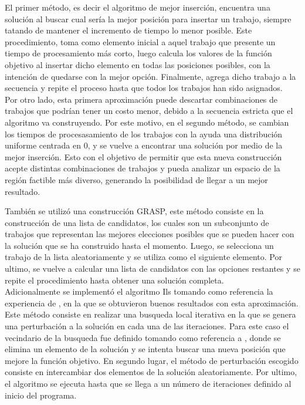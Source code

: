 \documentclass[10pt, twoside]{article}
\begin{document}
El primer método, es decir el algoritmo de mejor inserción, encuentra
una solución al buscar cual sería la mejor posición para insertar un trabajo,
siempre tatando de mantener el incremento de tiempo lo menor posible. Este
procedimiento, toma como elemento inicial a aquel trabajo que presente un tiempo de
procesamiento más corto, luego calcula los valores de la función objetivo
al insertar dicho elemento en todas las posiciones posibles, con la intención
de quedarse con la mejor opción. Finalmente, agrega dicho trabajo a la
secuencia y repite el proceso hasta que todos los trabajos han sido
asignados.\\

Por otro lado, esta primera aproximación puede descartar combinaciones de
trabajos que podrían tener un costo menor, debido a la secuencia estricta que el
algoritmo va construyendo. Por este motivo, en el segundo método, se cambian los
tiempos de procesasamiento de los trabajos con la ayuda una distribución
uniforme centrada en 0, y se vuelve a encontrar una solución por medio de la
mejor inserción. Esto con el objetivo de permitir que esta nueva construcción
acepte distintas combinaciones de trabajos y pueda analizar un espacio de la
región factible más diverso, generando la posibilidad de llegar a un mejor
resultado.

\newpage

También se utilizó una construcción GRASP, este método consiste en la
construcción de una lista de candidatos, los cuales son un subconjunto
de trabajos que representan las mejores elecciones posibles que se pueden hacer
con la solución que se ha construido hasta el momento. Luego, se selecciona un
trabajo de la lista aleatoriamente y se utiliza como el siguiente elemento. Por
ultimo, se vuelve a calcular una lista de candidatos con las opciones restantes
y se repite el procedimiento hasta obtener una solución completa.\\

Adicionalmente se implementó el algoritmo Ils tomando como referencia la
experiencia de \cite{ils}, en la que se obtuvieron buenos resultados con esta
aproximación. Este método consiste en realizar una busqueda local iterativa en
la que se genera una perturbación a la solución en cada una de las iteraciones.
Para este caso el vecindario de la busqueda fue definido tomando como referencia
a \cite{localsearch}, donde se elimina un elemento de la solución y se intenta
buscar una nueva posición que mejore la función objetivo. En segundo lugar, el
método de perturbación escogido consiste en intercambiar dos elementos de la solución
aleatoriamente. Por ultimo, el algoritmo se ejecuta hasta que se llega a un
número de iteraciones definido al inicio del programa.\\
\end{document}
